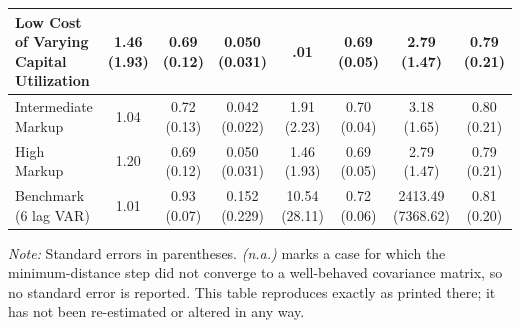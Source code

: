 \begin{table}[htbp]
{\begin{tabular}{|l|c|c|c|c|c|c|c|}
        \hline
        \shortstack[l]{Low Cost of Varying\\Capital Utilization}
            & \shortstack{1.46\\(1.93)} & \shortstack{0.69\\(0.12)} & \shortstack{0.050\\(0.031)} & \shortstack{.01\\\mbox{}} & \shortstack{0.69\\(0.05)} & \shortstack{2.79\\(1.47)} & \shortstack{0.79\\(0.21)} \\
        \hline
        Intermediate Markup
            & \shortstack{1.04\\\mbox{}} & \shortstack{0.72\\(0.13)} & \shortstack{0.042\\(0.022)} & \shortstack{1.91\\(2.23)} & \shortstack{0.70\\(0.04)} & \shortstack{3.18\\(1.65)} & \shortstack{0.80\\(0.21)} \\
        \hline
        High Markup
            & \shortstack{1.20\\\mbox{}} & \shortstack{0.69\\(0.12)} & \shortstack{0.050\\(0.031)} & \shortstack{1.46\\(1.93)} & \shortstack{0.69\\(0.05)} & \shortstack{2.79\\(1.47)} & \shortstack{0.79\\(0.21)} \\
        \hline
        Benchmark (6 lag VAR)
            & \shortstack{1.01\\\mbox{}} & \shortstack{0.93\\(0.07)} & \shortstack{0.152\\(0.229)} & \shortstack{10.54\\(28.11)} & \shortstack{0.72\\(0.06)} & \shortstack{2413.49\\(7368.62)} & \shortstack{0.81\\(0.20)} \\
        \hline\hline
    \end{tabular}%
    }

    \vspace{0.2cm}
    \raggedright
    \scriptsize{\textit{Note:} Standard errors in parentheses. \textit{(n.a.)} marks a case for which the minimum-distance step did not converge to a well-behaved covariance matrix, so no standard error is reported. This table reproduces \citet[Table~2]{ACEL2005WP} exactly as printed there; it has not been re-estimated or altered in any way.}
\end{table}
